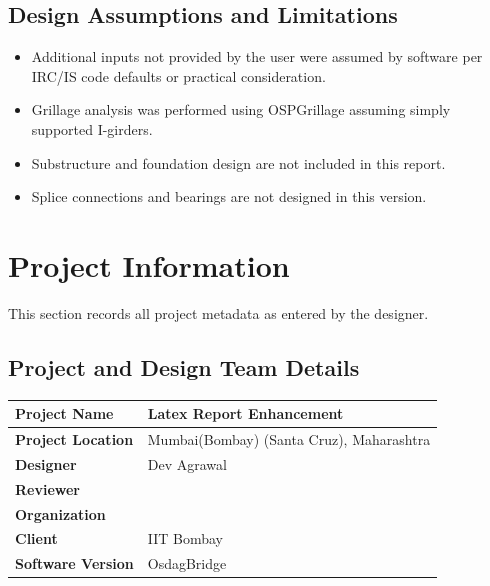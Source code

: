 \documentclass[12pt,a4paper]{report}
\numberwithin{table}{chapter}
\numberwithin{figure}{chapter}
\begin{document}
\section*{Design Assumptions and Limitations}
\label{sec:assumptions}

\begin{itemize}
\item Additional inputs not provided by the user were assumed by software per IRC/IS code defaults or practical consideration.
\item Grillage analysis was performed using OSPGrillage assuming simply supported I-girders.
\item Substructure and foundation design are not included in this report.
\item Splice connections and bearings are not designed in this version.
\end{itemize}

\titleformat{\chapter}[block]{\normalfont\Large\bfseries\centering}{\thechapter}{1em}{}
\titlespacing*{\chapter}{0pt}{-30pt}{10pt}


\chapter{Project Information}

This section records all project metadata as entered by the designer.

\section{Project and Design Team Details}
\label{sec:project-details}

\begin{tabular}{|L{5.5cm}|L{8.5cm}|}
\hline
\textbf{Project Name} & Latex Report Enhancement \\
\hline
\textbf{Project Location} & Mumbai(Bombay) (Santa Cruz), Maharashtra \\
\hline
\textbf{Designer} & Dev Agrawal \\
\hline
\textbf{Reviewer} &  \\
\hline
\textbf{Organization} &  \\
\hline
\textbf{Client} & IIT Bombay \\
\hline
\textbf{Software Version} & OsdagBridge \\
\hline
\end{tabular}
\end{document}
